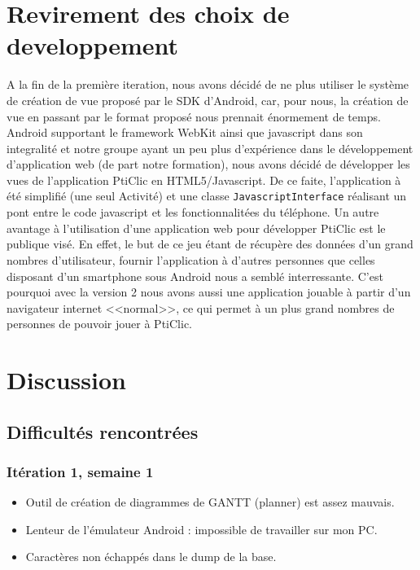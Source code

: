\documentclass[a4paper,11pt,french]{article}
\def\android{Android\texttrademark{}}
\begin{document}
\section{Revirement des choix de developpement} %
A la fin de la première iteration, nous avons décidé de ne plus utiliser le système de création de vue proposé par le SDK d'\android{}, car, pour nous, la création de vue en passant par le format proposé nous prennait énormement de temps. \android{} supportant le framework WebKit ainsi que javascript dans son integralité et notre groupe ayant un peu plus d'expérience dans le développement d'application web (de part notre formation), nous avons décidé de développer les vues de l'application PtiClic en HTML5/Javascript. De ce faite, l'application à été simplifié (une seul Activité) et une classe \verb!JavascriptInterface! réalisant un pont entre le code javascript et les fonctionnalitées du téléphone.
Un autre avantage à l'utilisation d'une application web pour développer PtiClic est le publique visé. En effet, le but de ce jeu étant de récupère des données d'un grand nombres d'utilisateur, fournir l'application à d'autres personnes que celles disposant d'un smartphone sous \android{} nous a semblé interressante. C'est pourquoi avec la version 2 nous avons aussi une application jouable à partir d'un navigateur internet <<normal>>, ce qui permet à un plus grand nombres de personnes de pouvoir jouer à PtiClic.

\section{Discussion}
\subsection{Difficultés rencontrées}
\label{sec:difficultes}
\subsubsection{Itération 1, semaine 1}
\begin{itemize}
\item Outil de création de diagrammes de GANTT (planner) est assez mauvais.
\item Lenteur de l'émulateur \android{} : impossible de travailler sur mon PC.%
\item Caractères non échappés dans le dump de la base.%
\end{itemize}
\end{document}
